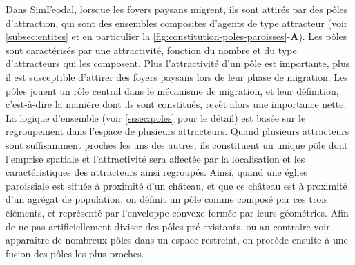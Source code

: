 \begin{tcolorbox}[breakable,left=0pt,right=0pt,top=0pt,bottom=0pt,
	colback=gray!15,colframe=gray!15,width=\dimexpr\textwidth\relax, 
	enlarge left by=0mm, boxsep=5pt,arc=0pt,outer arc=0pt]
	
Dans SimFeodal, lorsque les foyers paysans migrent, ils sont attirés par des pôles d'attraction, qui sont des ensembles composites d'agents de type attracteur (voir \cref{subsec:entites} et en particulier la \cref{fig:constitution-poles-paroisses}-\textbf{A}).
Les pôles sont caractérisés par une attractivité, fonction du nombre et du type d'attracteurs qui les composent.
Plus l'attractivité d'un pôle est importante, plus il est susceptible d'attirer des foyers paysans lors de leur phase de migration.
Les pôles jouent un rôle central dans le mécanisme de migration, et leur définition, c'est-à-dire la manière dont ils sont constitués, revêt alors une importance nette.
La logique d'ensemble (voir \cref{sssec:poles} pour le détail) est basée sur le regroupement dans l'espace de plusieurs attracteurs.
Quand plusieurs attracteurs sont suffisamment proches les uns des autres, ils constituent un unique pôle dont l'emprise spatiale et l'attractivité sera affectée par la localisation et les caractéristiques des attracteurs ainsi regroupés.
Ainsi, quand une église paroissiale est située à proximité\footnotemark{} d'un château, et que ce château est à proximité d'un agrégat de population, on définit un pôle comme composé par ces trois éléments, et représenté par l'enveloppe convexe formée par leurs géométries.
Afin de ne pas artificiellement diviser des pôles pré-existants, ou au contraire voir apparaître de nombreux pôles dans un espace restreint, on procède ensuite à une fusion des pôles les plus proches.
\end{tcolorbox}
%
%
